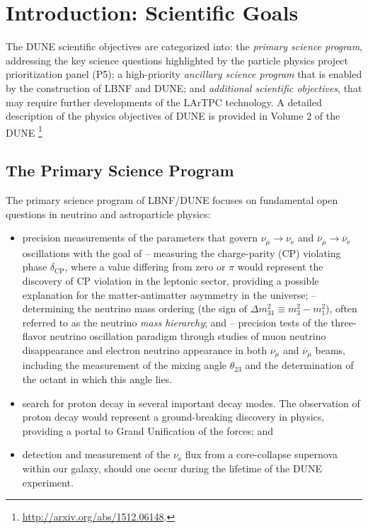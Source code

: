 \section{Introduction: Scientific Goals}
\label{sec:exec-summ-physics-goals}


The DUNE scientific objectives are categorized into: the \textit{primary science program}, addressing the key science questions 
highlighted by the particle physics project prioritization panel (P5); 
a high-priority \textit{ancillary science program} that is 
enabled by the construction of LBNF and DUNE; and \textit{additional scientific objectives}, that may require further developments 
of the LArTPC technology. A detailed description of the physics objectives of DUNE is provided in Volume 2 of the DUNE \footnote{ \url{http://arxiv.org/abs/1512.06148}.}

\subsection{The Primary Science Program}

The primary science program of LBNF/DUNE  focuses on fundamental open questions in neutrino and astroparticle physics: 
\begin{itemize}
  \item precision measurements of the parameters that govern $\nu_{\mu} \rightarrow \nu_\text{e}$ and
           $\overline{\nu}_{\mu} \rightarrow \overline{\nu}_\text{e}$ oscillations with the goal of
  \subitem -- measuring the charge-parity (CP) violating phase $\delta_\text{CP}$, where a value differing from zero or $\pi$ would represent the discovery of CP violation in the leptonic sector, providing a possible explanation for the matter-antimatter asymmetry in the universe;
  \subitem -- determining the neutrino mass ordering (the sign of $\Delta m^2_{31} \equiv m_3^2-m_1^2$), often referred to as the neutrino \textit{mass hierarchy}; and
  \subitem -- precision tests of the three-flavor neutrino oscillation paradigm through studies of muon neutrino disappearance 
    and electron neutrino appearance in both $\nu_\mu$ and $\overline{\nu}_{\mu}$ beams, including the 
    measurement of the mixing angle $\theta_{23}$ and the determination of the octant in which this angle lies.
    \item search for proton decay in several important decay modes. The observation of proton decay would represent a ground-breaking discovery in physics, providing a portal to Grand Unification of the forces; and
    \item detection and measurement of the $\nu_\text{e}$ flux from a core-collapse supernova within our galaxy, should one occur during the lifetime of the DUNE experiment.
\end{itemize}


